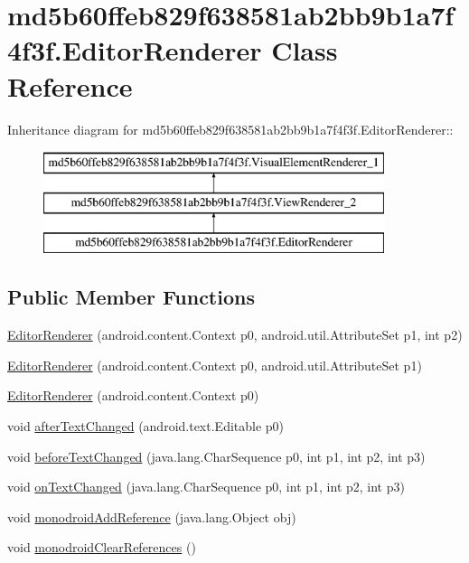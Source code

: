 \hypertarget{classmd5b60ffeb829f638581ab2bb9b1a7f4f3f_1_1_editor_renderer}{
\section{md5b60ffeb829f638581ab2bb9b1a7f4f3f.EditorRenderer Class Reference}
\label{classmd5b60ffeb829f638581ab2bb9b1a7f4f3f_1_1_editor_renderer}
}
Inheritance diagram for md5b60ffeb829f638581ab2bb9b1a7f4f3f.EditorRenderer::\begin{figure}[H]
\begin{center}
\leavevmode
\includegraphics[height=3cm]{classmd5b60ffeb829f638581ab2bb9b1a7f4f3f_1_1_editor_renderer}
\end{center}
\end{figure}
\subsection*{Public Member Functions}
\begin{CompactItemize}
\item 
\hyperlink{classmd5b60ffeb829f638581ab2bb9b1a7f4f3f_1_1_editor_renderer_126a5ef185db22511cc66e9cafd0d310}{EditorRenderer} (android.content.Context p0, android.util.AttributeSet p1, int p2)
\item 
\hyperlink{classmd5b60ffeb829f638581ab2bb9b1a7f4f3f_1_1_editor_renderer_ea191623f560a580a117cd8f184e59b3}{EditorRenderer} (android.content.Context p0, android.util.AttributeSet p1)
\item 
\hyperlink{classmd5b60ffeb829f638581ab2bb9b1a7f4f3f_1_1_editor_renderer_2bc23540ae25cddc293e56ebaef99158}{EditorRenderer} (android.content.Context p0)
\item 
void \hyperlink{classmd5b60ffeb829f638581ab2bb9b1a7f4f3f_1_1_editor_renderer_7cc8b388893791b82894b01e4627508d}{afterTextChanged} (android.text.Editable p0)
\item 
void \hyperlink{classmd5b60ffeb829f638581ab2bb9b1a7f4f3f_1_1_editor_renderer_96753b901a17611aedda80e2aa4801f8}{beforeTextChanged} (java.lang.CharSequence p0, int p1, int p2, int p3)
\item 
void \hyperlink{classmd5b60ffeb829f638581ab2bb9b1a7f4f3f_1_1_editor_renderer_5c47c614038fade51dab2c5f57a02d43}{onTextChanged} (java.lang.CharSequence p0, int p1, int p2, int p3)
\item 
void \hyperlink{classmd5b60ffeb829f638581ab2bb9b1a7f4f3f_1_1_editor_renderer_d947b0fcb8dfc7fa6df3ad187936d3be}{monodroidAddReference} (java.lang.Object obj)
\item 
void \hyperlink{classmd5b60ffeb829f638581ab2bb9b1a7f4f3f_1_1_editor_renderer_b75e496c1b4ff6e3f542989834b44b8d}{monodroidClearReferences} ()
\end{CompactItemize}
